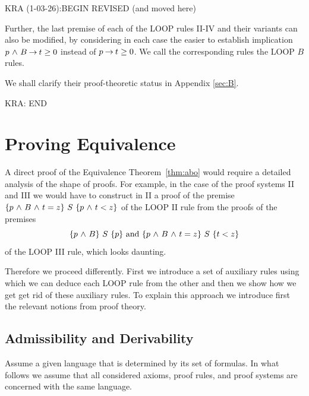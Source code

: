\documentclass[runningheads]{llncs}       %
\begin{document}


KRA (1-03-26):BEGIN REVISED (and moved here)

Further, the last premise of each of the LOOP rules II-IV and their
variants can also be modified, by considering in each case the easier
to establish implication $p \mbox{$\ \wedge\ $} B \mbox{$\:\rightarrow\:$} t \geq 0$ instead of
$p \mbox{$\:\rightarrow\:$} t \geq 0$.  We call the corresponding rules the LOOP $B$ rules.

We shall clarify their proof-theoretic status in Appendix \ref{sec:B}.

KRA: END 



\section{Proving Equivalence}

A direct proof of the Equivalence Theorem~\ref{thm:abo} would require a detailed
analysis of the shape of proofs. For example, in the case of the proof
systems II and III we would have to construct in II a proof of the premise
$ \mbox{$\{{p \mbox{$\ \wedge\ $} B \mbox{$\ \wedge\ $} t=z}\}\ {S}\ \{{p \mbox{$\ \wedge\ $} t<z}\}$}$ of the LOOP II rule from the proofs
of the premises 
\[
 \mbox{$\{{p \mbox{$\ \wedge\ $} B}\}\ {S}\ \{{p}\}$} \mbox{ and } \mbox{$\{{p \mbox{$\ \wedge\ $} B \mbox{$\ \wedge\ $} t=z}\}\ {S}\ \{{t<z}\}$}
\]
of the LOOP III rule, which looks daunting.

Therefore we proceed differently. First we introduce a set of
auxiliary rules using which we can deduce each LOOP rule from the
other and then we show how we get get rid of these auxiliary rules.
To explain this approach we introduce first the relevant notions from
proof theory.


\subsection{Admissibility and Derivability}

Assume a given language that is determined by its set of formulas.  In
what follows we assume that all considered axioms, proof rules, and
proof systems are concerned with the same language.
\end{document}
